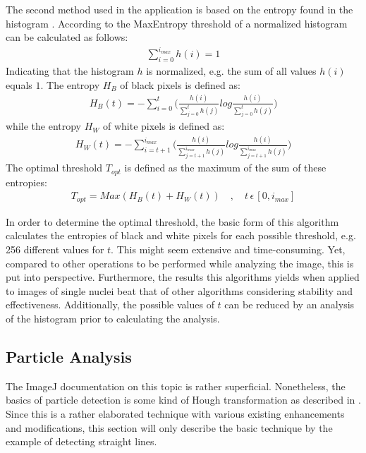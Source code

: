 \documentclass[a4paper, 12pt, twoside]{article}
\begin{document}
The second method used in the application is based on the entropy found in the
histogram \cite{kapur84}. According to \cite{fiji04} the MaxEntropy threshold of
a normalized histogram can be calculated as follows:
\begin{align*}
\sum_{i=0}^{i_{max}} h(i) = 1
\end{align*}
Indicating that the histogram $h$ is normalized, e.g. the sum of all
values $h(i)$ equals $1$. The entropy  $H_B$ of black pixels is defined as:
\begin{align*}
H_B(t) = - \sum_{i=0}^{t} \Bigg(\frac{h(i)}{ \sum_{j=0}^{t} h(j)}
log \frac{h(i)}{ \sum_{j=0}^{t} h(j)}\Bigg)
\end{align*}
while the entropy $H_W$ of white pixels is defined as:
\begin{align*}
H_W(t) = - \sum_{i=t+1}^{i_{max}} \Bigg(\frac{h(i)}{ \sum_{j=t+1}^{i_{max}}
h(j)} log
\frac{h(i)}{ \sum_{j=t+1}^{i_{max}} h(j)}\Bigg)
\end{align*}
The optimal threshold $T_{opt}$ is defined as the maximum of the sum of these
entropies:
\begin{align*}
T_{opt}=Max(H_B(t)+H_W(t)) \quad , \quad t \, \epsilon \, [0, i_{max}]
\end{align*}

In order to determine the optimal threshold, the basic form of this algorithm
calculates the entropies of black and white pixels for each possible threshold, e.g. 256
different values for $t$. This might seem extensive and time-consuming. Yet,
compared to other operations to be performed while analyzing the image, this is
put into perspective. Furthermore, the results this algorithms yields when
applied to images of single nuclei beat that of other algorithms considering
stability and effectiveness. Additionally, the possible values of $t$ can be
reduced by an analysis of the histogram prior to calculating the analysis.

\subsection{Particle Analysis}\label{sec:particle_analysis}

The ImageJ documentation on this topic is rather superficial. Nonetheless, the
basics of particle detection is some kind of Hough transformation as described
in \cite{duda71}. Since this is a rather elaborated technique with various
existing enhancements and modifications, this section will only describe the
basic technique by the example of detecting straight lines.
\end{document}
